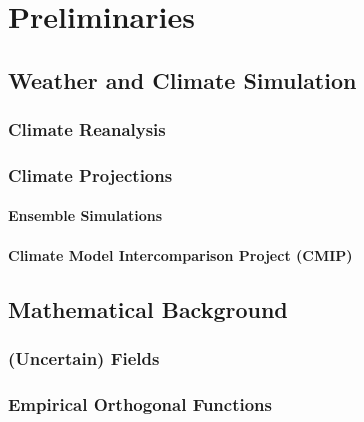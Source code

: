 \chapter{Preliminaries}
\label{ch:preliminaries}

\section{Weather and Climate Simulation}

\subsection{Climate Reanalysis}

\subsection{Climate Projections}

\subsubsection{Ensemble Simulations}

\subsubsection{Climate Model Intercomparison Project (CMIP)}

\section{Mathematical Background}

\subsection{(Uncertain) Fields}

\subsection{Empirical Orthogonal Functions}



